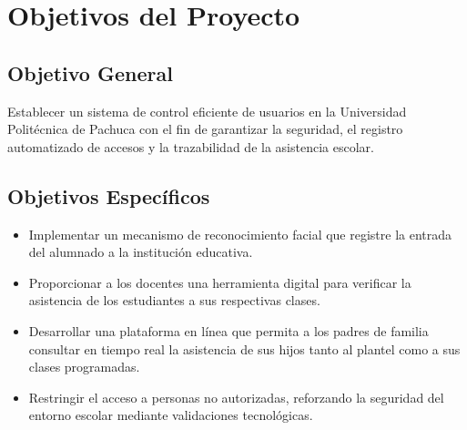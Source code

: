 \section{Objetivos del Proyecto}

\subsection{Objetivo General}


Establecer un sistema de control eficiente de usuarios en la Universidad Politécnica de Pachuca con el fin de garantizar la seguridad, el registro automatizado de accesos y la trazabilidad de la asistencia escolar.

\subsection{Objetivos Específicos}

\begin{itemize}
    \item Implementar un mecanismo de reconocimiento facial que registre la entrada del alumnado a la institución educativa.
    \item Proporcionar a los docentes una herramienta digital para verificar la asistencia de los estudiantes a sus respectivas clases.
    \item Desarrollar una plataforma en línea que permita a los padres de familia consultar en tiempo real la asistencia de sus hijos tanto al plantel como a sus clases programadas.
    \item Restringir el acceso a personas no autorizadas, reforzando la seguridad del entorno escolar mediante validaciones tecnológicas.
\end{itemize}